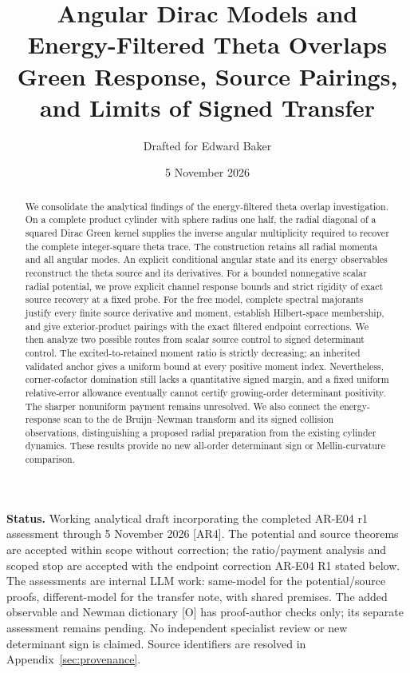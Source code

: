 \documentclass[11pt,letterpaper]{article}
\title{Angular Dirac Models and\\Energy-Filtered Theta Overlaps\\[5pt]
\large Green Response, Source Pairings, and Limits of Signed Transfer}
\author{Drafted for Edward Baker}
\date{5 November 2026}
\numberwithin{equation}{section}
\theoremstyle{remark}
\newcommand{\evid}[1]{\textsf{[#1]}}
\begin{document}
\maketitle
\begin{abstract}
We consolidate the analytical findings of the energy-filtered theta
overlap investigation. On a complete product cylinder with sphere radius
one half, the radial diagonal of a squared Dirac Green kernel supplies
the inverse angular multiplicity required to recover the complete
integer-square theta trace. The construction retains all radial
momenta and all angular modes. An explicit conditional angular state
and its energy observables reconstruct the theta source and its
derivatives. For a bounded nonnegative scalar radial
potential, we prove explicit channel response bounds and strict
rigidity of exact source recovery at a fixed probe. For the free model,
complete spectral majorants justify every finite source derivative and
moment, establish Hilbert-space membership, and give exterior-product
pairings with the exact filtered endpoint corrections. We then analyze
two possible routes from scalar source control to signed determinant
control. The excited-to-retained moment ratio is strictly decreasing;
an inherited validated anchor gives a uniform bound at every positive
moment index. Nevertheless, corner-cofactor domination still lacks a
quantitative signed margin, and a fixed uniform relative-error allowance
eventually cannot certify growing-order determinant positivity. The
sharper nonuniform payment remains unresolved. We also connect the
energy-response scan to the de Bruijn--Newman transform and its signed
collision observations, distinguishing a proposed radial preparation
from the existing cylinder dynamics. These results provide no new
all-order determinant sign or Mellin-curvature comparison.
\end{abstract}

\noindent\textbf{Status.} Working analytical draft incorporating the completed
AR-E04 r1 assessment through 5 November 2026 \evid{AR4}.
The potential and source theorems are accepted within scope without
correction; the ratio/payment analysis and scoped stop are accepted
with the endpoint correction AR-E04 R1 stated below.
The assessments are internal LLM work: same-model for the potential/source
proofs, different-model for the transfer note, with shared premises.
The added observable and Newman dictionary \evid{O} has proof-author
checks only; its separate assessment remains pending. No independent
specialist review or new determinant sign is claimed. Source identifiers
are resolved in Appendix~\ref{sec:provenance}.
\end{document}

